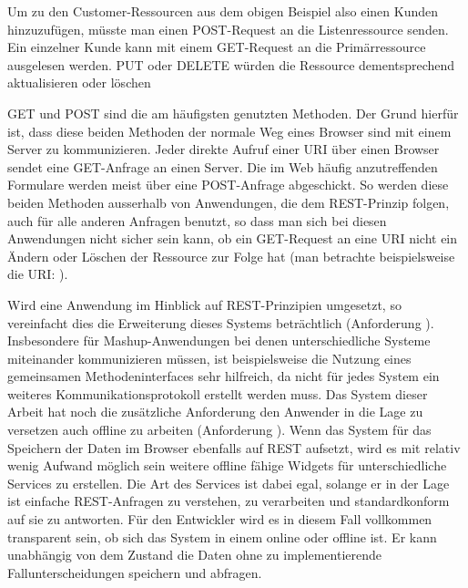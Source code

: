 Um zu den Customer-Ressourcen aus dem obigen Beispiel also einen Kunden hinzuzufügen, müsste man einen POST-Request an die Listenressource  senden. Ein einzelner Kunde kann mit einem GET-Request an die Primärressource  ausgelesen werden. PUT oder DELETE würden die Ressource dementsprechend aktualisieren oder löschen

GET und POST sind die am häufigsten genutzten Methoden. Der Grund hierfür ist, dass diese beiden Methoden der normale Weg eines Browser sind mit einem Server zu kommunizieren. Jeder direkte Aufruf einer URI über einen Browser sendet eine GET-Anfrage an einen Server. Die im Web häufig anzutreffenden Formulare werden meist über eine POST-Anfrage abgeschickt. So werden diese beiden Methoden ausserhalb von Anwendungen, die dem REST-Prinzip folgen, auch für alle anderen Anfragen benutzt, so dass man sich bei diesen Anwendungen nicht sicher sein kann, ob ein GET-Request an eine URI nicht ein Ändern oder Löschen der Ressource zur Folge hat (man betrachte beispielsweise die URI: ).

Wird eine Anwendung im Hinblick auf REST-Prinzipien umgesetzt, so vereinfacht dies die Erweiterung dieses Systems beträchtlich (Anforderung ). Insbesondere für Mashup-Anwendungen bei denen unterschiedliche Systeme miteinander kommunizieren müssen, ist beispielsweise die Nutzung eines gemeinsamen Methodeninterfaces sehr hilfreich, da nicht für jedes System ein weiteres Kommunikationsprotokoll erstellt werden muss. Das System dieser Arbeit hat noch die zusätzliche Anforderung den Anwender in die Lage zu versetzen auch offline zu arbeiten (Anforderung ). Wenn das System für das Speichern der Daten im Browser ebenfalls auf REST aufsetzt, wird es mit relativ wenig Aufwand möglich sein weitere offline fähige Widgets für unterschiedliche Services zu erstellen. Die Art des Services ist dabei egal, solange er in der Lage ist einfache REST-Anfragen zu verstehen, zu verarbeiten und standardkonform auf sie zu antworten. Für den Entwickler wird es in diesem Fall vollkommen transparent sein, ob sich das System in einem online oder offline ist. Er kann unabhängig von dem Zustand die Daten ohne zu implementierende Fallunterscheidungen speichern und abfragen.


